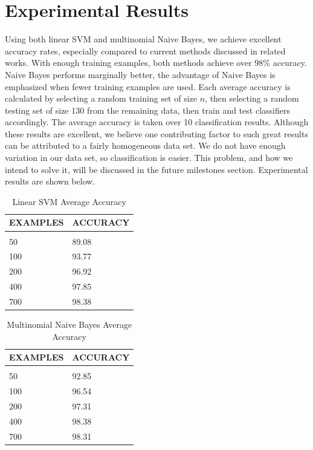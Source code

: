 \documentclass{article} %
\begin{document}
\section{Experimental Results}
Using both linear SVM and multinomial Naive Bayes, we achieve excellent accuracy rates, especially compared to
current methods discussed in related works. With enough training examples, both methods achieve over 98\% accuracy. 
Naive Bayes performs marginally better, the advantage of Naive Bayes is emphasized when fewer training examples
are used. Each average accuracy is calculated by selecting a random training set of size $n$, then selecting a
random testing set of size 130 from the remaining data, then train and test classifiers accordingly. The average
accuracy is taken over 10 classification results. Although these results are excellent, we believe one contributing
factor to such great results can be attributed to a fairly homogeneous data set. We do not have enough variation
in our data set, so classification is easier. This problem, and how we intend to solve it, will be discussed
in the future milestones section. Experimental results are shown below.


\begin{table}[hp]
\caption{Linear SVM Average Accuracy}
\begin{center}
\begin{tabular}{ll}
\multicolumn{1}{c}{\bf EXAMPLES}  &\multicolumn{1}{c}{\bf ACCURACY}
\\ \hline \\
50              &89.08 \\
100             &93.77 \\
200             &96.92 \\
400             &97.85 \\
700             &98.38 \\
\end{tabular}
\end{center}
\end{table}

\begin{table}[hp]
\caption{Multinomial Naive Bayes Average Accuracy}
\begin{center}
\begin{tabular}{ll}
\multicolumn{1}{c}{\bf EXAMPLES}  &\multicolumn{1}{c}{\bf ACCURACY}
\\ \hline \\
50              &92.85 \\
100             &96.54 \\
200             &97.31 \\
400             &98.38 \\
700             &98.31 \\
\end{tabular}
\end{center}
\end{table}
\end{document}

